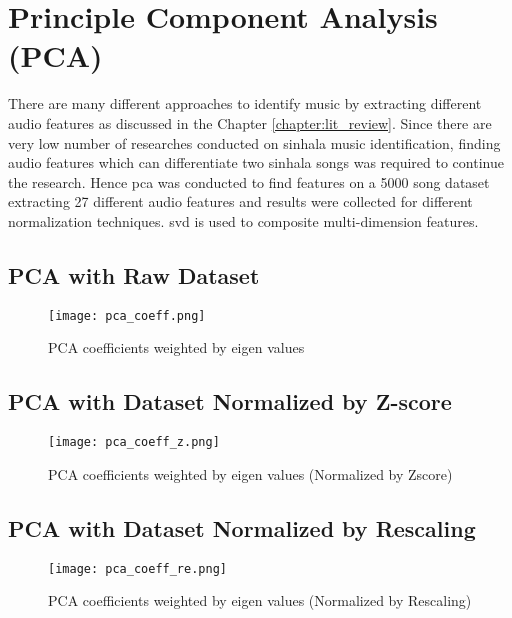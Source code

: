 \section{Principle Component Analysis (PCA)}
There are many different approaches to identify music by extracting different audio features as
discussed in the Chapter \ref{chapter:lit_review}. Since there are very low number of researches
conducted on sinhala music identification, finding audio features which can differentiate two 
sinhala songs was required to continue the research. Hence \ac{pca} was conducted to find features
on a 5000 song dataset extracting 27 different audio features and results were collected for 
different normalization techniques. \ac{svd} is used to composite multi-dimension features.

\subsection{PCA with Raw Dataset}



\begin{figure}[H]
    \centering
    \texttt{[image: pca\_coeff.png]}
    \caption{PCA coefficients weighted by eigen values}
    \label{fig:pca_coeff}
\end{figure}

\subsection{PCA with Dataset Normalized by Z-score}
\begin{figure}[H]
    \centering
    \texttt{[image: pca\_coeff\_z.png]}
    \caption{PCA coefficients weighted by eigen values (Normalized by Zscore)}
    \label{fig:pca_coeff_z}
\end{figure}

\subsection{PCA with Dataset Normalized by Rescaling}
\begin{figure}[H]
    \centering
    \texttt{[image: pca\_coeff\_re.png]}
    \caption{PCA coefficients weighted by eigen values (Normalized by Rescaling)}
    \label{fig:pca_coeff_re}
\end{figure}